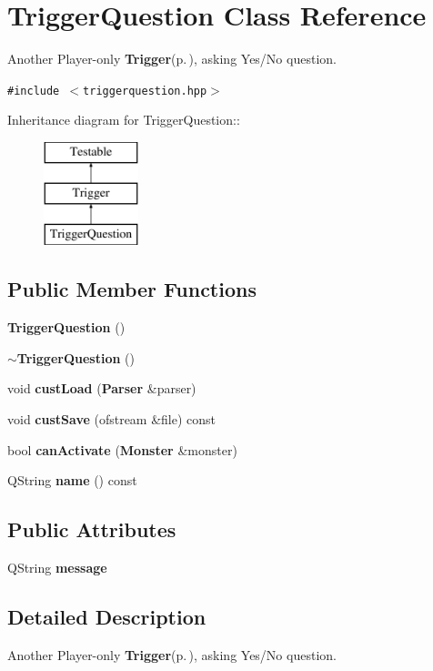 \section{Trigger\-Question Class Reference}
\label{classTriggerQuestion}
Another Player-only {\bf Trigger}{\rm (p.\,\pageref{classTrigger})}, asking Yes/No question.  


{\tt \#include $<$triggerquestion.hpp$>$}

Inheritance diagram for Trigger\-Question::\begin{figure}[H]
\begin{center}
\leavevmode
\includegraphics[height=3cm]{classTriggerQuestion}
\end{center}
\end{figure}
\subsection*{Public Member Functions}
\begin{CompactItemize}
\item 
{\bf Trigger\-Question} ()
\item 
{\bf $\sim$Trigger\-Question} ()
\item 
void {\bf cust\-Load} ({\bf Parser} \&parser)
\item 
void {\bf cust\-Save} (ofstream \&file) const 
\item 
bool {\bf can\-Activate} ({\bf Monster} \&monster)
\item 
QString {\bf name} () const 
\end{CompactItemize}
\subsection*{Public Attributes}
\begin{CompactItemize}
\item 
QString {\bf message}
\end{CompactItemize}


\subsection{Detailed Description}
Another Player-only {\bf Trigger}{\rm (p.\,\pageref{classTrigger})}, asking Yes/No question. 



